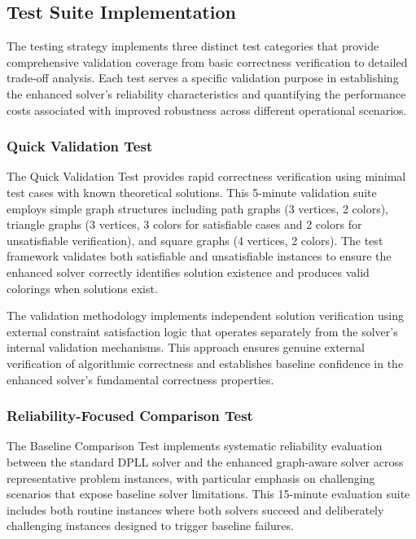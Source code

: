 \subsection{Test Suite Implementation}
\label{sec:test-suite-implementation}

The testing strategy implements three distinct test categories that provide comprehensive validation coverage from basic correctness verification to detailed trade-off analysis. Each test serves a specific validation purpose in establishing the enhanced solver's reliability characteristics and quantifying the performance costs associated with improved robustness across different operational scenarios.

\subsubsection{Quick Validation Test}
\label{sec:quick-validation-test}
The Quick Validation Test provides rapid correctness verification using minimal test cases with known theoretical solutions. This 5-minute validation suite employs simple graph structures including path graphs (3 vertices, 2 colors), triangle graphs (3 vertices, 3 colors for satisfiable cases and 2 colors for unsatisfiable verification), and square graphs (4 vertices, 2 colors). The test framework validates both satisfiable and unsatisfiable instances to ensure the enhanced solver correctly identifies solution existence and produces valid colorings when solutions exist.

The validation methodology implements independent solution verification using external constraint satisfaction logic that operates separately from the solver's internal validation mechanisms. This approach ensures genuine external verification of algorithmic correctness and establishes baseline confidence in the enhanced solver's fundamental correctness properties.

\subsubsection{Reliability-Focused Comparison Test}
\label{sec:baseline-comparison-test}
The Baseline Comparison Test implements systematic reliability evaluation between the standard DPLL solver and the enhanced graph-aware solver across representative problem instances, with particular emphasis on challenging scenarios that expose baseline solver limitations. This 15-minute evaluation suite includes both routine instances where both solvers succeed and deliberately challenging instances designed to trigger baseline failures.

